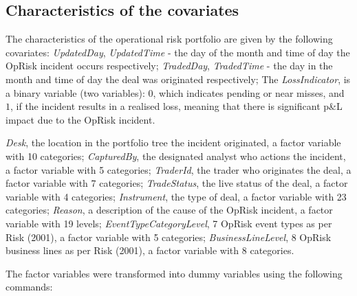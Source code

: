 \documentclass[]{DissertateUSU}
\begin{document}
\subsection{Characteristics of the covariates}

The characteristics of the operational risk portfolio are given by the
following covariates: \emph{UpdatedDay}, \emph{UpdatedTime} - the day of
the month and time of day the OpRisk incident occurs respectively;
\emph{TradedDay}, \emph{TradedTime} - the day in the month and time of
day the deal was originated respectively; The \emph{LossIndicator}, is a
binary variable (two variables): \(0\), which indicates pending or near
misses, and \(1\), if the incident results in a realised loss, meaning
that there is significant p\&L impact due to the OpRisk
incident.\medskip

\emph{Desk}, the location in the portfolio tree the incident originated,
a factor variable with 10 categories; \emph{CapturedBy}, the designated
analyst who actions the incident, a factor variable with 5 categories;
\emph{TraderId}, the trader who originates the deal, a factor variable
with 7 categories; \emph{TradeStatus}, the live status of the deal, a
factor variable with 4 categories; \emph{Instrument}, the type of deal,
a factor variable with 23 categories; \emph{Reason}, a description of
the cause of the OpRisk incident, a factor variable with 19 levels;
\emph{EventTypeCategoryLevel}, 7 OpRisk event types as per Risk (2001),
a factor variable with 5 categories; \emph{BusinessLineLevel}, 8 OpRisk
business lines as per Risk (2001), a factor variable with 8
categories.\medskip

The factor variables were transformed into dummy variables using the
following commands: \singlespacing
\end{document}
